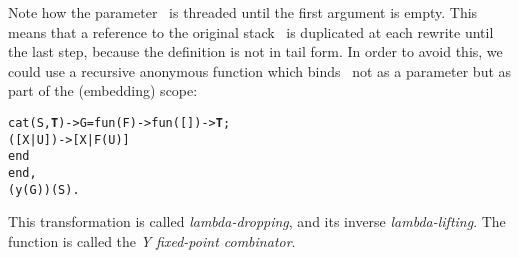 Note how the parameter~ is threaded until the first
argument is empty. This means that a reference to the original
stack~ is duplicated at each rewrite until the last step,
because the definition is not in tail form. In order to avoid this, we
could use a recursive anonymous function which binds~ not
as a parameter but as part of the (embedding) scope:
\begin{alltt}
cat(S,\textbf{T}) -> G = fun(F) -> fun(   []) -> \textbf{T};\hfill% T \emph{in scope}
                             ([X|U]) -> [X|F(U)]
                          end
                end,
            (y(G))(S).
\end{alltt}
This transformation is called
\emph{lambda\hyp{}dropping}, and its inverse
\emph{lambda\hyp{}lifting}. The function
 is called the \emph{Y fixed\hyp{}point combinator}.

